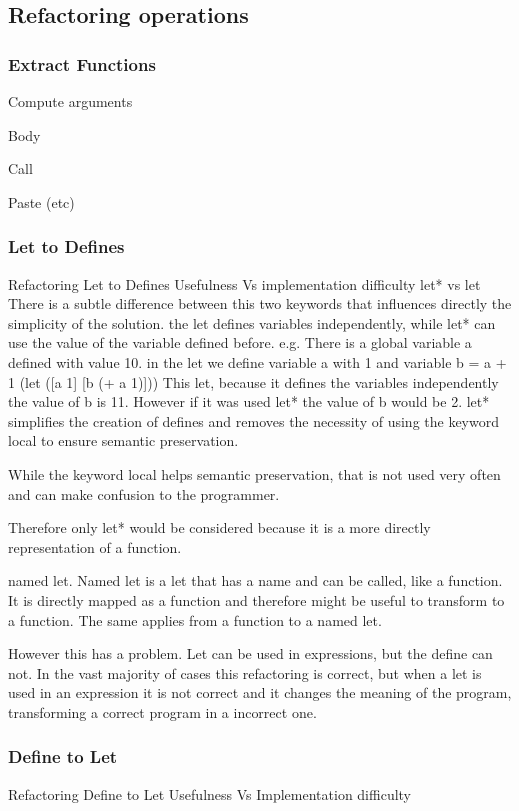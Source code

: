 \subsection{Refactoring operations}
\subsubsection{Extract Functions}
Compute arguments

Body

Call

Paste (etc)

\subsubsection{Let to Defines}
Refactoring Let to Defines Usefulness Vs implementation difficulty
let* vs let
There is a subtle difference between this two keywords that influences directly the simplicity of the solution.
the let defines variables independently, while let* can use the value of the variable defined before.
e.g.
There is a global variable a defined with value 10.
in the let we define variable a with 1 and variable b = a + 1
(let ([a 1]
[b (+ a 1)]))
This let, because it defines the variables independently the value of b is 11.
However if it was used let* the value of b would be 2.
let* simplifies the creation of defines and removes the necessity of using the keyword local to ensure semantic preservation.

While the keyword local helps semantic preservation, that is not used very often and can make confusion to the programmer.

Therefore only let* would be considered because it is a more directly representation of a function.

named let.
Named let is a let that has a name and can be called, like a function.
It is directly mapped as a function and therefore might be useful to transform to a function.
The same applies from a function to a named let.

However this has a problem. Let can be used in expressions, but the define can not.
In the vast majority of cases this refactoring is correct, but when a let is used in an expression
it is not correct and it changes the meaning of the program, transforming a correct
program in a incorrect one.
\subsubsection{Define to Let}
Refactoring Define to Let Usefulness Vs Implementation difficulty

